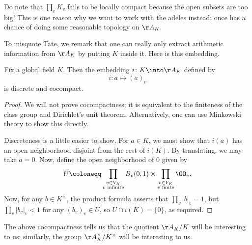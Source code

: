 \documentclass{article}
\begin{document}
\begin{remark}
	Do note that $\prod_vK_v$ fails to be locally compact because the open subsets are too big! This is one reason why we want to work with the adeles instead: once has a chance of doing some reasonable topology on $\AA_K$.
\end{remark}
To misquote Tate, we remark that one can really only extract arithmetic information from $\AA_K$ by putting $K$ inside it. Here is this embedding.
\begin{proposition}
	Fix a global field $K$. Then the embedding $i\colon K\into\AA_K$ defined by
	\[i\colon a\mapsto(a)_v\]
	is discrete and cocompact.
\end{proposition}
\begin{proof}
	We will not prove cocompactness; it is equivalent to the finiteness of the class group and Dirichlet's unit theorem. Alternatively, one can use Minkowski theory to show this directly.

	Discreteness is a little easier to show. For $a\in K$, we must show that $i(a)$ has an open neighborhood disjoint from the rest of $i(K)$. By translating, we may take $a=0$. Now, define the open neighborhood of $0$ given by
	\[U\coloneqq\prod_{\substack{v\in V_K\\v\text{ infinite}}}B_v(0,1)\times\prod_{\substack{v\in V_K\\v\text{ finite}}}\OO_v.\]
	Now, for any $b\in K^\times$, the product formula asserts that $\prod_v\left|b\right|_v=1$, but $\prod_v\left|b_v\right|_v<1$ for any $(b_v)_v\in U$, so $U\cap i(K)=\{0\}$, as required.
\end{proof}
The above cocompactness tells us that the quotient $\AA_K/K$ will be interesting to us; similarly, the group $\AA_K^\times/K^\times$ will be interesting to us.
\end{document}
